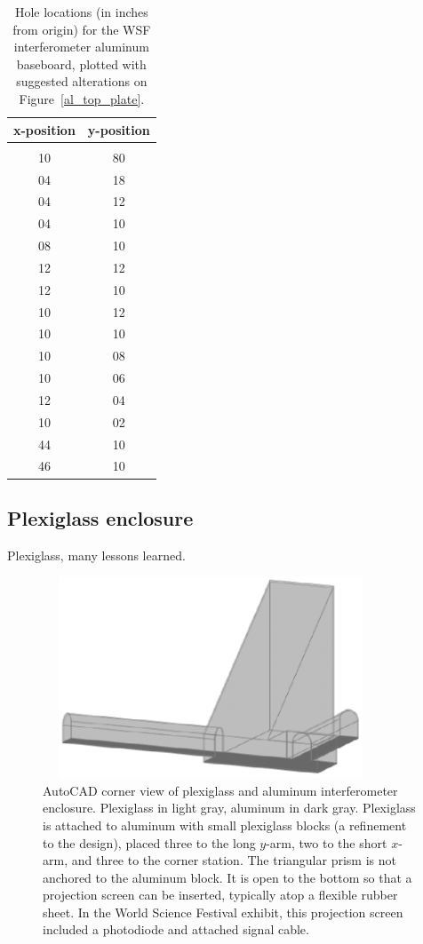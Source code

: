 \begin{table}[t]
\begin{center}
\begin{tabular}{ c c }
x-position & y-position \\
\hline \\
10 & 80\\
04 & 18\\
04 & 12\\
04 & 10\\
08 & 10\\
12 & 12\\
12 & 10\\
10 & 12\\
10 & 10\\
10 & 08\\
10 & 06\\
12 & 04\\
10 & 02\\
44 & 10\\
46 & 10 \\
\hline
\end{tabular}
\caption{Hole locations (in inches from origin) for the WSF interferometer aluminum baseboard, plotted with suggested alterations on Figure~\ref{al_top_plate}.}
\label{aluminum_baseboard_hole_locations}
\end{center}
\end{table}

        \subsection{Plexiglass enclosure}
        \label{enclosure}

            Plexiglass, many lessons learned.

        \begin{figure}
        \begin{center}
        \includegraphics[height=60mm, width=100mm]{view-corner.eps}
        \caption{AutoCAD corner view of plexiglass and aluminum interferometer enclosure. Plexiglass in light gray, aluminum in dark gray. Plexiglass is attached to aluminum with small plexiglass blocks (a refinement to the design), placed three to the long $y$-arm, two to the short $x$-arm, and three to the corner station. The triangular prism is not anchored to the aluminum block. It is open to the bottom so that a projection screen can be inserted, typically atop a flexible rubber sheet. In the World Science Festival exhibit, this projection screen included a photodiode and attached signal cable.}
        \label{plex-view-corner}
        \end{center}
        \end{figure}

